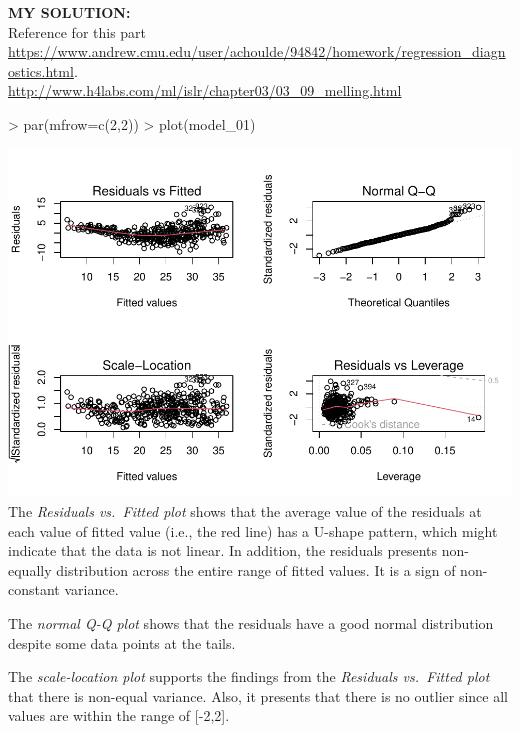 \documentclass[
]{article}
\newenvironment{Shaded}{\begin{snugshade}}{\end{snugshade}}
\newcommand{\AttributeTok}[1]{\textcolor[rgb]{0.77,0.63,0.00}{#1}}
\newcommand{\DecValTok}[1]{\textcolor[rgb]{0.00,0.00,0.81}{#1}}
\newcommand{\FunctionTok}[1]{\textcolor[rgb]{0.00,0.00,0.00}{#1}}
\newcommand{\NormalTok}[1]{#1}
\newcommand{\SpecialCharTok}[1]{\textcolor[rgb]{0.00,0.00,0.00}{#1}}
\begin{document}
\textbf{MY SOLUTION:}\\
Reference for this part
\url{https://www.andrew.cmu.edu/user/achoulde/94842/homework/regression_diagnostics.html}.\\
\url{http://www.h4labs.com/ml/islr/chapter03/03_09_melling.html}

\begin{Shaded}
\begin{Highlighting}[]
\SpecialCharTok{\textgreater{}} \FunctionTok{par}\NormalTok{(}\AttributeTok{mfrow=}\FunctionTok{c}\NormalTok{(}\DecValTok{2}\NormalTok{,}\DecValTok{2}\NormalTok{))}
\SpecialCharTok{\textgreater{}} \FunctionTok{plot}\NormalTok{(model\_01)}
\end{Highlighting}
\end{Shaded}

\includegraphics{Homework_09_new_Pan_files/figure-latex/unnamed-chunk-5-1.pdf}
The \emph{Residuals vs.~Fitted plot} shows that the average value of the
residuals at each value of fitted value (i.e., the red line) has a
U-shape pattern, which might indicate that the data is not linear. In
addition, the residuals presents non-equally distribution across the
entire range of fitted values. It is a sign of non-constant variance.

The \emph{normal Q-Q plot} shows that the residuals have a good normal
distribution despite some data points at the tails.

The \emph{scale-location plot} supports the findings from the
\emph{Residuals vs.~Fitted plot} that there is non-equal variance. Also,
it presents that there is no outlier since all values are within the
range of {[}-2,2{]}.
\end{document}
